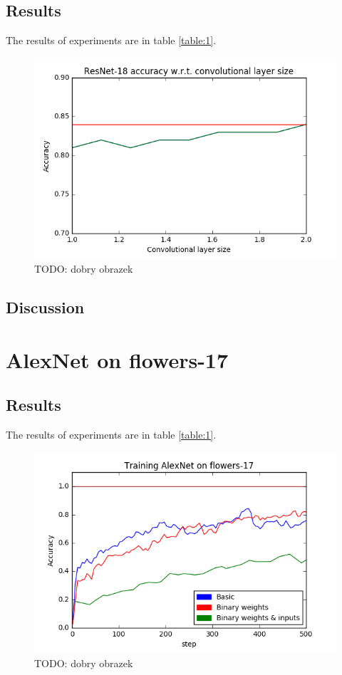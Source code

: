 \documentclass[licencjacka]{pracamgr}
\begin{document}
	\subsection{Results}
		 The results of experiments are in table \ref{table:1}.
		\begin{figure}[h]
				\caption{TODO: dobry obrazek}
				\centering
				\includegraphics[width=\textwidth]{images/filter-ratio}
			\end{figure}
	\subsection{Discussion}
	\section{AlexNet on flowers-17}
	\subsection{Results}
		 The results of experiments are in table \ref{table:1}.
		\begin{figure}[h]
				\caption{TODO: dobry obrazek}
				\centering
				\includegraphics[width=\textwidth]{images/AlexNet-flowers17}
			\end{figure}
\end{document}
